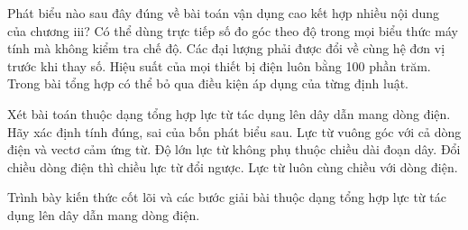 \begin{ex}
Phát biểu nào sau đây đúng về bài toán vận dụng cao kết hợp nhiều nội dung của chương iii?
\choice
{Có thể dùng trực tiếp số đo góc theo độ trong mọi biểu thức máy tính mà không kiểm tra chế độ.}
{\True Các đại lượng phải được đổi về cùng hệ đơn vị trước khi thay số.}
{Hiệu suất của mọi thiết bị điện luôn bằng 100 phần trăm.}
{Trong bài tổng hợp có thể bỏ qua điều kiện áp dụng của từng định luật.}
\end{ex}

\begin{ex}
Xét bài toán thuộc dạng tổng hợp lực từ tác dụng lên dây dẫn mang dòng điện. Hãy xác định tính đúng, sai của bốn phát biểu sau.
\choiceTF
{\True Lực từ vuông góc với cả dòng điện và vectơ cảm ứng từ.}
{Độ lớn lực từ không phụ thuộc chiều dài đoạn dây.}
{\True Đổi chiều dòng điện thì chiều lực từ đổi ngược.}
{Lực từ luôn cùng chiều với dòng điện.}
\end{ex}

\begin{bt}
Trình bày kiến thức cốt lõi và các bước giải bài thuộc dạng tổng hợp lực từ tác dụng lên dây dẫn mang dòng điện.
\end{bt}

